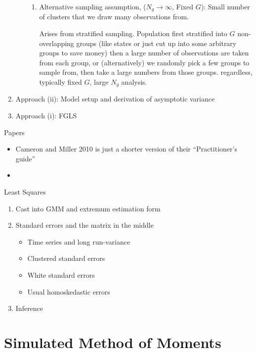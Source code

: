 \documentclass[12pt]{article}
\theoremstyle{plain}
\theoremstyle{definition}
\theoremstyle{remark}
\newcommand{\ra}{\rightarrow}
\begin{document}
\begin{enumerate}
\begin{enumerate}
\begin{enumerate}
          \item Alternative sampling assumption,
            ($N_g\ra\infty$, Fixed $G$):
            Small number of clusters that we draw many observations from.

            Arises from stratified sampling.
            Population first stratified into $G$ non-overlapping groups (like
            states or just cut up into some arbitrary groups to save money)
            then a large number of observations are taken from each group,
            or (alternatively) we randomly pick a few groups to sample from,
            then take a large numbers from those groups.
            regardless, typically fixed $G$, large $N_g$ analysis.
        \end{enumerate}
    \end{enumerate}


  \item
    Approach (ii):
    Model setup and derivation of asymptotic variance

  \item
    Approach (i): FGLS
\end{enumerate}
Papers
\begin{itemize}
  \item Cameron and Miller 2010 is just a shorter version of their
    ``Practitioner's guide''
  \item
\end{itemize}

\clearpage
Least Squares
\begin{enumerate}
  \item
    Cast into GMM and extremum estimation form
  \item
    Standard errors and the matrix in the middle
    \begin{itemize}
      \item Time series and long run-variance
      \item Clustered standard errors
      \item White standard errors
      \item Usual homoskedastic errors
    \end{itemize}
  \item Inference
\end{enumerate}

\clearpage
\section{Simulated Method of Moments}
\end{document}
